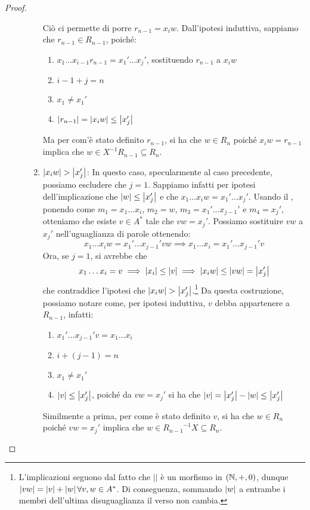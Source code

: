 \begin{proof}
\begin{description}
\begin{enumerate}
          Ciò ci permette di porre \(r_{n-1} = x_{i}w\). Dall'ipotesi induttiva, sappiamo che \(r_{n-1} \in R_{n-1}\), poiché:
          \begin{enumerate}
            \item \(x_1\ldots x_{i-1}r_{n-1} = x_1'\ldots x_j'\), sostituendo \(r_{n-1}\) a \(x_{i}w\)
            \item \(i-1+j=n\)
            \item \(x_1 \neq x_1'\)
            \item \(\left|r_{n-1}\right| = \left|x_i w\right| \leq \left|x_j'\right|\)
          \end{enumerate}
          Ma per com'è stato definito \(r_{n-1}\), si ha che \(w \in R_n\) poiché \(x_{i} w = r_{n-1}\) implica che \(w \in X^{-1} R_{n-1} \subseteq R_n\).
        \item \(\left|x_{i}w\right| > \left|x_j'\right|\):
          In questo caso, specularmente al caso precedente, possiamo escludere che \(j=1\).
          Sappiamo infatti per ipotesi dell'implicazione che \(\left|w\right| \leq \left|x_j'\right|\) e che \(x_1\ldots x_i w = x_1'\ldots x_j'\). Usando il , ponendo come \(m_1 = x_1\ldots x_i\), \(m_2 = w\), \(m_3 = x_1'\ldots x_{j-1}'\) e \(m_4 = x_j'\), otteniamo che esiste \(v \in A^*\) tale che \(vw=x_j'\).
          Possiamo sostituire \(vw\) a \(x_j'\) nell'uguaglianza di parole ottenendo:
          \[x_1\ldots x_i w = x_1'\ldots x_{j-1}' vw \implies x_1\ldots x_i = x_1'\ldots x_{j-1}' v \]
          Ora, se \(j=1\), si avrebbe che 
            \[x_1\ldots x_i = v \implies \left|x_i\right| \leq \left|v\right| \implies \left|x_i w\right| \leq \left|vw\right| = \left|x_j'\right| \]
          che contraddice l'ipotesi che \(\left|x_{i}w\right| > \left|x_j'\right|\).\footnote{L'implicazioni seguono dal fatto che \(||\) è un morfismo in \((\mathbb{N},+,0)\), dunque \(\left|vw\right| = \left|v\right|+\left|w\right| \forall v,w \in A^*\). Di conseguenza, sommando \(\left|w\right|\) a entrambe i membri dell'ultima disuguaglianza il verso non cambia.}
          Da questa costruzione, possiamo notare come, per ipotesi induttiva, \(v\) debba appartenere a \(R_{n-1}\), infatti:
          \begin{enumerate}
            \item \(x_1'\ldots x_{j-1}' v = x_1\ldots x_i\)
            \item \(i + (j-1) = n\)
            \item \(x_1 \neq x_1'\)
            \item \(\left|v\right| \leq \left|x_j'\right|\), poiché da \(vw = x_j'\) si ha che \(\left|v\right| = \left|x_j'\right| - \left|w\right| \leq \left|x_j'\right|\)
        \end{enumerate}
        Similmente a prima, per come è stato definito \(v\), si ha che \(w \in R_n\) poiché \(vw = x_j'\) implica che \(w \in {R_{n-1}}^{-1} X \subseteq R_n\).
      \end{enumerate}
  \end{description}
\end{proof}


